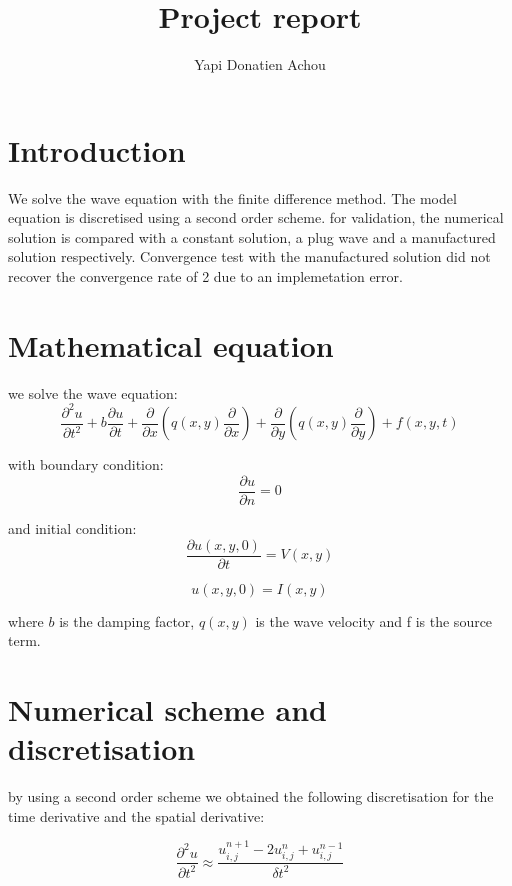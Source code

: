 \documentclass[10pt,a4paper]{report}
\begin{document}
\author{Yapi Donatien Achou}
\title{Project report }
\maketitle

\section{Introduction}
We solve the wave equation with the finite difference method. The model equation is discretised using a second order scheme. for validation, the numerical solution is compared with a constant solution, a plug wave and a manufactured solution respectively. Convergence test with the manufactured solution did not recover the convergence rate of 2 due to an implemetation error.

\section{Mathematical equation}
we solve the wave equation:
\begin{equation}\label{main}
\frac{\partial^{2} u}{\partial t^{2}} +b\frac{\partial u}{\partial t}  +\frac{\partial}{\partial x}\left(  q(x,y)\frac{\partial}{\partial x}   \right) +\frac{\partial}{\partial y}\left(  q(x,y)\frac{\partial}{\partial y}   \right) +f(x,y,t)
\end{equation}

with boundary condition:
\begin{equation}
\frac{\partial u}{\partial n} = 0
\end{equation}

and initial condition:
\begin{equation}
\frac{\partial u(x,y,0)}{\partial t} = V(x,y)
\end{equation}

\begin{equation}
u(x,y,0) = I(x,y)
\end{equation}

where $b$ is the damping factor, $q(x,y)$ is the wave velocity and f is the source term.

\section{Numerical scheme and discretisation}
by using a second order scheme we obtained the following discretisation for the time derivative and the spatial derivative:
 
\begin{equation}\label{t2}
\frac{\partial^{2} u}{\partial t^{2}} \approx \frac{ u_{i,j}^{n+1}-2u_{i,j}^{n}+u_{i,j}^{n-1}}{\delta t^{2}} 
\end{equation} 
\end{document}
